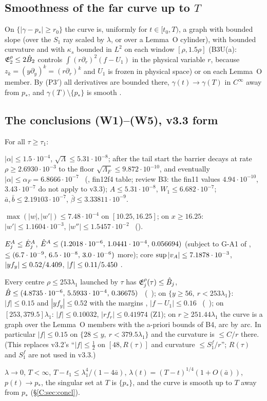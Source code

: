 \documentclass[11pt]{article}
\begin{document}
\subsection{Smoothness of the far curve up to $T$}
On $\{|\gamma-p_*|\ge r_0\}$ the curve is, uniformly for $t\in[t_0,T)$, a graph with bounded slope (over the $S_1$ ray scaled by $\lambda$, or over a Lemma~O cylinder), with bounded curvature and with $\kappa_s$ bounded in $L^2$ on each window $[\rho,1.5\rho]$ (B3U(a): $\mathfrak E^\rho_2\le2\hat B_2$ controls $\int(r\partial_r)^2(f-U_1)$ in the physical variable $r$, because $z_k=(y\partial_y)^k=(r\partial_r)^k$ and $U_1$ is frozen in physical space) or on each Lemma~O member. By (P3$'$) all derivatives are bounded there, $\gamma(t)\to\gamma(T)$ in $C^\infty$ away from $p_*$, and $\gamma(T)\setminus\{p_*\}$ is smooth \tP.

\subsection{The conclusions (W1)--(W5), v3.3 form}\label{C:sec:W}
For all $\tau\ge\tau_1$:
\begin{description}[leftmargin=1.2em]
\item[(W1) trapping] $|\alpha|\le1.5\cdot10^{-4}$, $\sqrt\Lambda\le5.31\cdot10^{-8}$; after the tail start the barrier decays at rate $\rho\ge2.6930\cdot10^{-3}$ to the floor $\sqrt{\Lambda_F}\le9.872\cdot10^{-10}$, and eventually $|\alpha|\le\alpha_F=6.8666\cdot10^{-7}$ \tC\ (\SV, fin12f4 table; review B3: the fin11 values $4.94\cdot10^{-10}$, $3.43\cdot10^{-7}$ do not apply to v3.3); $A\le5.31\cdot10^{-8}$, $W_1\le6.682\cdot10^{-7}$; $\bar a,\bar b\le2.19103\cdot10^{-7}$, $\bar\beta\le3.33811\cdot10^{-9}$.
\item[(W2) tip] $\max(|w|,|w'|)\le7.48\cdot10^{-4}$ on $[10.25,16.25]$; on $x\ge16.25$: $|w'|\le1.1604\cdot10^{-3}$, $|w''|\le1.5457\cdot10^{-2}$ \tC\ (\SV).
\item[(W3) shells] $E^A_j\le\hat E^A_j$, $\hat E^A\le(1.2018\cdot10^{-6},\,1.0441\cdot10^{-4},\,0.056694)$ (subject to G-A1 of , $\le(6.7\cdot10^{-9},\,6.5\cdot10^{-8},\,3.0\cdot10^{-6})$ more); core $\sup|v_A|\le7.1878\cdot10^{-3}$, $|yf_y|\le0.52/4.409$, $|f|\le0.11/5.450$ \tC\tB.
\item[(W4) far field] Every centre $\rho\le253\lambda_1$ launched by $\tau$ has $\mathfrak E^\rho_j(\tau)\le\hat B_j$, $\hat B\le(4.8735\cdot10^{-6},\,5.5933\cdot10^{-4},\,0.36675)$ \tC\ (\SU\ ); on $\{y\ge56,\ r<253\lambda_1\}$: $|f|\le0.15$ and $|yf_y|\le0.52$ with the margins \UmarV, $|f-U_1|\le0.16$ \tC\ (\SU\ ); on $[253,379.5]\lambda_1$: $|f|\le0.10032$, $|rf_r|\le0.41974$ (Z1); on $r\ge251.44\lambda_1$ the curve is a graph over the Lemma~O members with the a-priori bounds of B4, arc by arc. In particular $|f|\le0.15$ on $\{28\le y,\ r<379.5\lambda_1\}$ and the curvature is $\le C/r$ there. (This replaces v3.2's ``$|f|\le\frac12$ on $[48,R(\tau)]$ and curvature $\le S_1^f/r$''; $R(\tau)$ and $S_1^f$ are not used in v3.3.)
\item[(W5) consequences] $\lambda\to0$, $T<\infty$, $T-t_1\le\lambda_1^4/(1-4\bar a)$, $\lambda(t)=(T-t)^{1/4}(1+O(\bar a))$, $p(t)\to p_*$, the singular set at $T$ is $\{p_*\}$, and the curve is smooth up to $T$ away from $p_*$ (\S\ref{C:sec:concl}).
\end{description}
\end{document}
